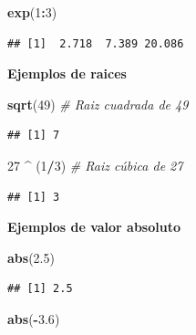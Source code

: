 \documentclass[10pt,]{krantz}
\makeatletter
\newenvironment{Shaded}{\begin{snugshade}}{\end{snugshade}}
\newcommand{\KeywordTok}[1]{\textcolor[rgb]{0.13,0.29,0.53}{\textbf{#1}}}
\newcommand{\DecValTok}[1]{\textcolor[rgb]{0.00,0.00,0.81}{#1}}
\newcommand{\FloatTok}[1]{\textcolor[rgb]{0.00,0.00,0.81}{#1}}
\newcommand{\StringTok}[1]{\textcolor[rgb]{0.31,0.60,0.02}{#1}}
\newcommand{\CommentTok}[1]{\textcolor[rgb]{0.56,0.35,0.01}{\textit{#1}}}
\newcommand{\OperatorTok}[1]{\textcolor[rgb]{0.81,0.36,0.00}{\textbf{#1}}}
\newcommand{\NormalTok}[1]{#1}
\newenvironment{kframe}{%
\medskip{}
\setlength{\fboxsep}{.8em}
 \def\at@end@of@kframe{}%
 \ifinner\ifhmode%
  \def\at@end@of@kframe{\end{minipage}}%
  \begin{minipage}{\columnwidth}%
 \fi\fi%
 \def\FrameCommand##1{\hskip\@totalleftmargin \hskip-\fboxsep
 \colorbox{shadecolor}{##1}\hskip-\fboxsep
     \hskip-\linewidth \hskip-\@totalleftmargin \hskip\columnwidth}%
 \MakeFramed {\advance\hsize-\width
   \@totalleftmargin\z@ \linewidth\hsize
   \@setminipage}}%
 {\par\unskip\endMakeFramed%
 \at@end@of@kframe}
\renewenvironment{Shaded}{\begin{kframe}}{\end{kframe}}
\makeatother
\begin{document}
\begin{Shaded}
\begin{Highlighting}[]
\KeywordTok{exp}\NormalTok{(}\DecValTok{1}\OperatorTok{:}\DecValTok{3}\NormalTok{)}
\end{Highlighting}
\end{Shaded}

\begin{verbatim}
## [1]  2.718  7.389 20.086
\end{verbatim}

\textbf{Ejemplos de raices}

\begin{Shaded}
\begin{Highlighting}[]
\KeywordTok{sqrt}\NormalTok{(}\DecValTok{49}\NormalTok{)  }\CommentTok{# Raiz cuadrada de 49}
\end{Highlighting}
\end{Shaded}

\begin{verbatim}
## [1] 7
\end{verbatim}

\begin{Shaded}
\begin{Highlighting}[]
\DecValTok{27} \OperatorTok{^}\StringTok{ }\NormalTok{(}\DecValTok{1}\OperatorTok{/}\DecValTok{3}\NormalTok{)  }\CommentTok{# Raiz cúbica de 27}
\end{Highlighting}
\end{Shaded}

\begin{verbatim}
## [1] 3
\end{verbatim}

\textbf{Ejemplos de valor absoluto}

\begin{Shaded}
\begin{Highlighting}[]
\KeywordTok{abs}\NormalTok{(}\FloatTok{2.5}\NormalTok{)}
\end{Highlighting}
\end{Shaded}

\begin{verbatim}
## [1] 2.5
\end{verbatim}

\begin{Shaded}
\begin{Highlighting}[]
\KeywordTok{abs}\NormalTok{(}\OperatorTok{-}\FloatTok{3.6}\NormalTok{)}
\end{Highlighting}
\end{Shaded}
\end{document}
